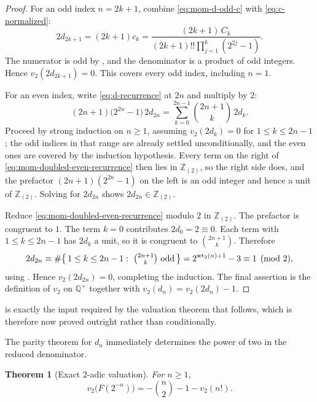 \documentclass[11pt,oneside]{article}
\newtheorem{theorem}{Theorem}[section]
\theoremstyle{definition}
\theoremstyle{remark}
\newcommand{\Q}{\mathbb Q}
\newcommand{\Z}{\mathbb Z}
\newcommand{\wt}{\operatorname{wt}_2}
\newcommand{\vtwo}{v_2}
\begin{document}
\begin{proof}
For an odd index $n=2k+1$, combine \eqref{eq:mom-d-odd-c} with \eqref{eq:c-normalized}:
\begin{equation*}
 2d_{2k+1}=(2k+1)c_k
 =\frac{(2k+1)\,C_k}{(2k+1)!!\prod_{j=1}^{k}(2^{2j}-1)}.
\end{equation*}
The numerator is odd by , and the denominator is a product of odd
integers.  Hence $\vtwo(2d_{2k+1})=0$.  This covers every odd index, including $n=1$.

For an even index, write \eqref{eq:d-recurrence} at $2n$ and multiply by $2$:
\begin{equation}
 (2n+1)\bigl(2^{2n}-1\bigr)\,2d_{2n}
 =\sum_{k=0}^{2n-1}\binom{2n+1}{k}\,2d_k.                   \label{eq:mom-doubled-even-recurrence}
\end{equation}
Proceed by strong induction on $n\ge1$, assuming $\vtwo(2d_k)=0$ for $1\le k\le2n-1$; the odd
indices in that range are already settled unconditionally, and the even ones are covered by
the induction hypothesis.  Every term on the right of \eqref{eq:mom-doubled-even-recurrence}
then lies in $\Z_{(2)}$, so the right side does, and the prefactor
$(2n+1)(2^{2n}-1)$ on the left is an odd integer and hence a unit of $\Z_{(2)}$.  Solving for
$2d_{2n}$ shows $2d_{2n}\in\Z_{(2)}$.

Reduce \eqref{eq:mom-doubled-even-recurrence} modulo $2$ in $\Z_{(2)}$.  The prefactor is
congruent to $1$.  The term $k=0$ contributes $2d_0=2\equiv0$.  Each term with
$1\le k\le2n-1$ has $2d_k$ a unit, so it is congruent to $\binom{2n+1}{k}$.  Therefore
\begin{equation*}
 2d_{2n}\equiv\#\bigl\{\,1\le k\le2n-1:\ \tbinom{2n+1}{k}\text{ odd}\,\bigr\}
 =2^{\wt(n)+1}-3\equiv1\pmod2,
\end{equation*}
using .  Hence $\vtwo(2d_{2n})=0$, completing the induction.  The
final assertion is the definition of $\vtwo$ on $\Q^\times$ together with
$\vtwo(d_n)=\vtwo(2d_n)-1$.
\end{proof}

 is exactly the input required by the valuation theorem that follows,
which is therefore now proved outright rather than conditionally.

The parity theorem for $d_n$ immediately determines the power of two in the reduced
denominator.

\begin{theorem}[Exact $2$-adic valuation]
For $n\ge1$,
\begin{equation}
 \vtwo\bigl(F(2^{-n})\bigr)
 =-\binom n2-1-\vtwo(n!).                                 \label{eq:valuation-inverse}
\end{equation}
\end{theorem}
\end{document}

